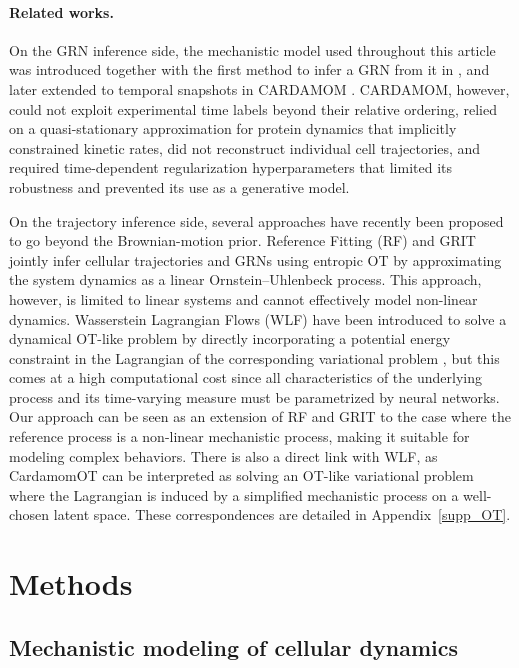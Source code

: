 \documentclass[a4paper, 11pt]{article}
\theoremstyle{plain}
\theoremstyle{remark}
\begin{document}
\paragraph{Related works.}
On the GRN inference side, the mechanistic model used throughout this article was introduced together with the first method to infer a GRN from it in \cite{herbachinferring2017, herbach2018modelisation}, and later extended to temporal snapshots in CARDAMOM \cite{ventre2023one}. CARDAMOM, however, could not exploit experimental time labels beyond their relative ordering, relied on a quasi-stationary approximation for protein dynamics that implicitly constrained kinetic rates, did not reconstruct individual cell trajectories, and required time-dependent regularization hyperparameters that limited its robustness and prevented its use as a generative model. 

On the trajectory inference side, several approaches have recently been proposed to go beyond the Brownian-motion prior. Reference Fitting (RF) \cite{zhang2024joint} and GRIT \cite{lamoline2025dynamic} jointly infer cellular trajectories and GRNs using entropic OT by approximating the system dynamics as a linear Ornstein–Uhlenbeck process. This approach, however, is limited to linear systems and cannot effectively model non-linear dynamics. Wasserstein Lagrangian Flows (WLF) have been introduced to solve a dynamical OT-like problem by directly incorporating a potential energy constraint in the Lagrangian of the corresponding variational problem \cite{neklyudov2023computational}, but this comes at a high computational cost since all characteristics of the underlying process and its time-varying measure must be parametrized by neural networks. Our approach can be seen as an extension of RF and GRIT to the case where the reference process is a non-linear mechanistic process, making it suitable for modeling complex behaviors. There is also a direct link with WLF, as CardamomOT can be interpreted as solving an OT-like variational problem where the Lagrangian is induced by a simplified mechanistic process on a well-chosen latent space. These correspondences are detailed in Appendix~\ref{supp_OT}.



\section{Methods}
\label{methods_section}

\subsection{Mechanistic modeling of cellular dynamics}
\label{sec:mechanistic_model}
\end{document}
